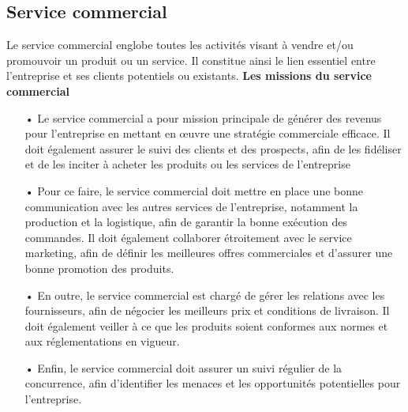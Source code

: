 \documentclass[edit,12pt,a4paper,ChapStyle,oneside,doubleinterligne]{report}
\begin{document}
\subsection{Service commercial}
Le service commercial englobe toutes les activités visant à vendre et/ou promouvoir un produit ou un service. Il constitue ainsi le lien essentiel entre l'entreprise et ses clients potentiels ou existants\cite{Service}.
\newline\newline\textbf{Les missions du service commercial}\newline
\begin{itemize}
    \item [•]   Le service commercial a pour mission principale de générer des revenus pour l’entreprise en mettant en œuvre une stratégie commerciale efficace. Il doit également assurer le suivi des clients et des prospects, afin de les fidéliser et de les inciter à acheter les produits ou les services de l’entreprise
    \item [•]	Pour ce faire, le service commercial doit mettre en place une bonne communication avec les autres services de l’entreprise, notamment la production et la logistique, afin de garantir la bonne exécution des commandes. Il doit également collaborer étroitement avec le service marketing, afin de définir les meilleures offres commerciales et d’assurer une bonne promotion des produits.
    \item [•]   En outre, le service commercial est chargé de gérer les relations avec les fournisseurs, afin de négocier les meilleurs prix et conditions de livraison. Il doit également veiller à ce que les produits soient conformes aux normes et aux réglementations en vigueur.
    \item [•]   Enfin, le service commercial doit assurer un suivi régulier de la concurrence, afin d’identifier les menaces et les opportunités potentielles pour l’entreprise.
\end{itemize}
\end{document}
